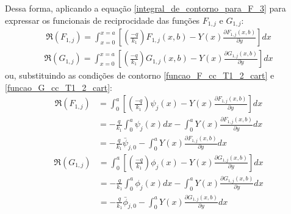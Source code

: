 Dessa forma, aplicando a equação \eqref{integral_de_contorno_para_F_3} para expressar os funcionais de reciprocidade das funções $F_{1,j}$ e $G_{1,j}$:
\begin{align}
\Re(F_{1,j})
=
\int_{x=0}^{x=a} \left[\left(\frac{-q}{k_1}\right)F_{1,j}(x, b) - Y(x)\frac{\partial F_{1,j}(x, b)}{\partial y}\right] dx
\label{integral_de_contorno_para_F1_0}
\end{align}
\begin{align}
\Re(G_{1,j})
=
\int_{x=0}^{x=a} \left[\left(\frac{-q}{k_1}\right)G_{1,j}(x, b) - Y(x)\frac{\partial G_{1,j}(x, b)}{\partial y}\right] dx
\label{integral_de_contorno_para_G1_0}
\end{align}
ou, substituindo as condições de contorno \eqref{funcao_F_cc_T1_2_cart} e \eqref{funcao_G_cc_T1_2_cart}:
\begin{align}
\Re(F_{1,j})
& =
\int_0^a \left[\left(\frac{-q}{k_1}\right)\psi_j(x) - Y(x)\frac{\partial F_{1,j}(x, b)}{\partial y}\right] dx \nonumber \\
& =
-\frac{q}{k_1}\int_0^a\psi_j(x)dx - \int_0^a Y(x)\frac{\partial F_{1,j}(x, b)}{\partial y} dx \nonumber \\
& =
-\frac{q}{k_1}\bar{\psi}_{j,0} - \int_0^a Y(x)\frac{\partial F_{1,j}(x, b)}{\partial y} dx
\label{integral_de_contorno_para_F1}
\end{align}
%
\begin{align}
\Re(G_{1,j})
& =
\int_0^a \left[\left(\frac{-q}{k_1}\right)\phi_j(x) - Y(x)\frac{\partial G_{1,j}(x, b)}{\partial y}\right] dx \nonumber \\
& =
-\frac{q}{k_1}\int_0^a\phi_j(x)dx - \int_0^a Y(x)\frac{\partial G_{1,j}(x, b)}{\partial y} dx
 \nonumber \\
 & =
 -\frac{q}{k_1}\bar{\phi}_{j,0} - \int_0^a Y(x)\frac{\partial G_{1,j}(x, b)}{\partial y} dx
\label{integral_de_contorno_para_G1}
\end{align}

